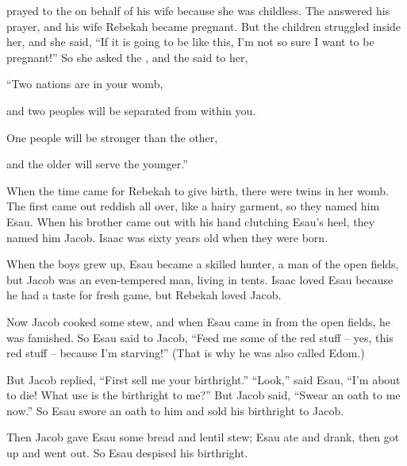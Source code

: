 {prayed
to the
{}
on behalf
of his wife
because
she was
childless.
The
{}
answered
his prayer,
and his wife
Rebekah
became pregnant.
But the children
struggled
inside her,
and she said,
“If
it is going
to be like
this,
I’m
not so
sure I want
to be pregnant!” So
she asked
the {},
and the
{}
said
to her,
\par }{\Q “Two
nations
are in your womb,
\par }{\Q and two
peoples
will be separated
from within
you.
\par }{\Q One people
will be stronger
than the other,
\par }{\Q and the older
will serve
the younger.”
\par }{\PP {}When
the time
came for Rebekah to give birth,
there
were twins
in her womb.
The first
came out
reddish
all
over, like a hairy
garment,
so
they named
him Esau.
When his brother
came out
with his hand
clutching
Esau’s
heel,
they named
him Jacob.
Isaac
was sixty
years
old
when they were born.
\par }{\PP {}When the boys
grew
up, Esau
became a skilled
hunter,
a man
of the open fields,
but Jacob
was an even-tempered
man,
living
in tents.
Isaac
loved
Esau
because
he had a taste for fresh game,
but Rebekah
loved
Jacob.
\par }{\PP {}Now
Jacob
cooked
some stew,
and when Esau
came
in from
the open fields,
he was
famished.
So Esau
said
to
Jacob,
“Feed
me some of the red stuff – yes, this red stuff – because I’m starving!” (That is why he was also called Edom.)
\par }{\PP {}But Jacob
replied,
“First sell
me your birthright.”
“Look,”
said
Esau,
“I’m
about
to die! What
use is the birthright to me?”
But Jacob
said,
“Swear
an oath to me now.”
So Esau swore
an oath to him and sold
his birthright
to Jacob.
\par }{\PP {}Then Jacob
gave
Esau
some bread
and lentil
stew;
Esau ate
and drank,
then got
up and went
out. So Esau
despised
his birthright.

}
